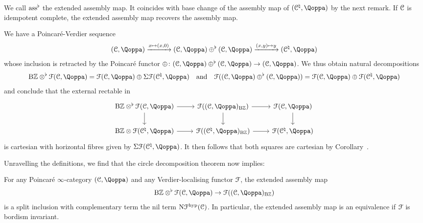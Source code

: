 We %
call $\mathrm{ass}^{\flat}$ %
the extended assembly map. It coincides with base change of the assembly map of $(\C^{\natural},\QF)$ by the next remark.
If $\mathcal C$ is idempotent complete, the extended assembly map recovers the assembly map.



\begin{remark}
\label{remark:circle-decompose-2}%
We have a Poincaré-Verdier sequence
\[
(\C,\QF) \xrightarrow{x \mapsto (x,0)} (\C,\QF) \oplus^{\flat} (\C,\QF) \xrightarrow{(x,y) \mapsto y} (\C^{\natural},\QF)
\]
whose inclusion is retracted by the Poincaré functor $\oplus \colon (\C,\QF) \oplus^{\flat} (\C,\QF) \to (\C,\QF)$. We thus obtain natural decompositions
\[
\B\ZZ \otimes^{\flat} \F(\C,\QF) = \F(\C,\QF) \oplus \Sig\F(\C^{\natural},\QF) \quad\text{and}\quad \F((\C,\QF) \oplus^{\flat} (\C,\QF)) = \F(\C,\QF) \oplus \F(\C^{\natural},\QF)
\]
and conclude that the external rectable in %
\[
\begin{tikzcd}
\B\ZZ \otimes^{\flat} \F(\C,\QF) \ar[r]\ar[d]& \F((\C,\QF)_{\B\ZZ})\ar[r]\ar[d] & \F(\C,\QF) \ar[d] \\
\B\ZZ \otimes \F(\C^\natural,\QF) \ar[r] & \F((\C^{\natural},\QF)_{\B\ZZ})\ar[r]& \F(\C^\natural,\QF)
\end{tikzcd}
\]
is cartesian with horizontal fibres given by $\Sig\F(\C^{\natural},\QF)$. It then follows that both squares are cartesian by Corollary~.


\end{remark}


Unravelling the definitions, we find that the circle decomposition theorem now implies: 
\begin{corollary}
For any Poincar\'e $\infty$-category $(\C,\QF)$ and any Verdier-localising functor $\mathcal{F}$, the extended assembly map 
\[
\B\ZZ \otimes^\flat \F(\C,\QF) \to \F((\C,\QF)_{\B\ZZ})
\]
is a split inclusion with complementary term the nil term $\mathrm{N}\mathcal{F}^{\mathrm{hyp}}(\mathcal C)$. In particular, the extended assembly map is an equivalence if $\mathcal{F}$ is bordism invariant.
\end{corollary}




